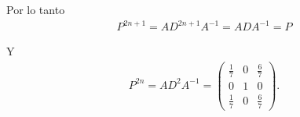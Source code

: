 Por lo tanto
\begin{align}
     P^{2n + 1} = A D^{2n+1} A^{-1} = A D A^{-1} = P
\end{align}

Y 
\begin{align}
     P^{2n} = A D^{2} A^{-1} = 
                            \begin{pmatrix}
                                \frac{1}{7}     &   0   &   \frac{6}{7}     \\
                                0               &   1   &   0               \\
                                \frac{1}{7}     &   0   &   \frac{6}{7}
                            \end{pmatrix}.
\end{align}

